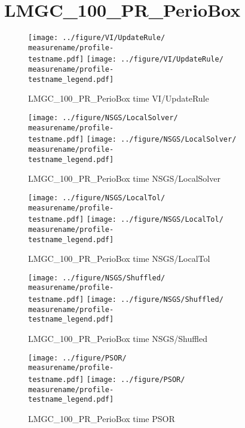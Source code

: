 \documentclass[a4paper]{article}
\begin{document}
\makeRR   %



\tableofcontents
\def\measurename{time}

\def\figwidth{0.8\textwidth}

\def\testname{LMGC_100_PR_PerioBox}
\def\testnamechar{LMGC\_100\_PR\_PerioBox}
\section{\testnamechar}
\begin{figure}[htbp]
  \centering
  \texttt{[image: ../figure/VI/UpdateRule/\\measurename/profile-\\testname.pdf]}
  \texttt{[image: ../figure/VI/UpdateRule/\\measurename/profile-\\testname\_legend.pdf]}
\caption{\testnamechar{  } \measurename{  } VI/UpdateRule}
\end{figure}
\begin{figure}[htbp]
  \centering
  \texttt{[image: ../figure/NSGS/LocalSolver/\\measurename/profile-\\testname.pdf]}
  \texttt{[image: ../figure/NSGS/LocalSolver/\\measurename/profile-\\testname\_legend.pdf]}
\caption{\testnamechar{  } \measurename { }NSGS/LocalSolver}
\end{figure}
\begin{figure}[htbp]
  \centering
  \texttt{[image: ../figure/NSGS/LocalTol/\\measurename/profile-\\testname.pdf]}
  \texttt{[image: ../figure/NSGS/LocalTol/\\measurename/profile-\\testname\_legend.pdf]}
\caption{\testnamechar{  } \measurename { }NSGS/LocalTol}
\end{figure}

\begin{figure}[htbp]
  \centering
  \texttt{[image: ../figure/NSGS/Shuffled/\\measurename/profile-\\testname.pdf]}
  \texttt{[image: ../figure/NSGS/Shuffled/\\measurename/profile-\\testname\_legend.pdf]}
\caption{\testnamechar{  } \measurename { }NSGS/Shuffled}
\end{figure}

\begin{figure}[htbp]
  \centering
  \texttt{[image: ../figure/PSOR/\\measurename/profile-\\testname.pdf]}
  \texttt{[image: ../figure/PSOR/\\measurename/profile-\\testname\_legend.pdf]}
\caption{\testnamechar{  } \measurename { }PSOR}
\end{figure}
\end{document}
